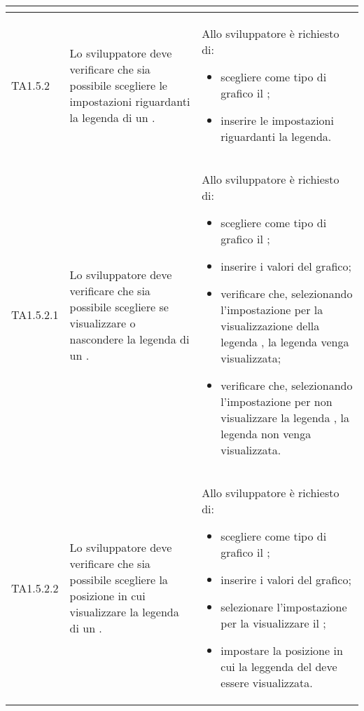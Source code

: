 \begin{longtabu}{| X[0.5] | X | X |}
\begin{itemize}
		\end{itemize}
\\ \hline

	TA1.5.2 & Lo sviluppatore deve verificare che sia possibile scegliere le impostazioni riguardanti la legenda di un .

		& Allo sviluppatore è richiesto di:
		\begin{itemize}
			\item scegliere come tipo di grafico il ;
			\item inserire le impostazioni riguardanti la legenda.
		\end{itemize}
\\ \hline

	TA1.5.2.1 & Lo sviluppatore deve verificare che sia possibile scegliere se visualizzare o nascondere la legenda di un .
		
		& Allo sviluppatore è richiesto di:
		\begin{itemize}
			\item scegliere come tipo di grafico il ;
			\item inserire i valori del grafico;
			\item verificare che, selezionando l'impostazione per la visualizzazione della legenda , la legenda venga visualizzata;
			\item verificare che, selezionando l'impostazione per non visualizzare la legenda , la legenda non venga visualizzata.
		\end{itemize}
\\ \hline

	TA1.5.2.2 & Lo sviluppatore deve verificare che sia possibile scegliere la posizione in cui visualizzare la legenda di un .
			
		& Allo sviluppatore è richiesto di:
		\begin{itemize}
			\item scegliere come tipo di grafico il ;
			\item inserire i valori del grafico;
			\item selezionare l'impostazione per la visualizzare il ;
			\item impostare la posizione in cui la leggenda del  deve essere visualizzata.
		\end{itemize}
\\ \hline


\end{longtabu}
